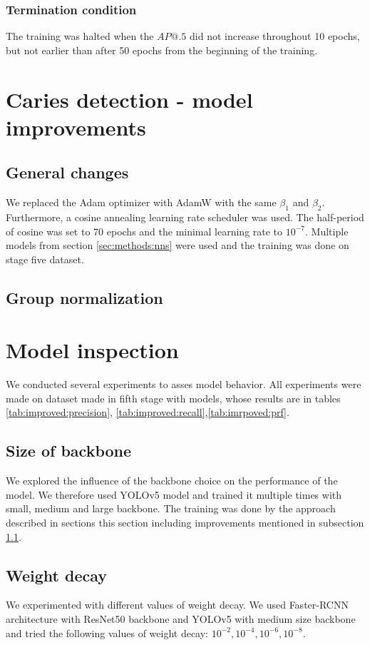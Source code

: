 \subsubsection{Termination condition}
The training was halted when the $AP@.5$ did not increase throughout 10 epochs, but not earlier than after 50 epochs from the beginning of the training.

\section{Caries detection - model improvements}
\subsection{General changes}
\label{sec:general_changes}
We replaced the Adam optimizer with AdamW with the same $\beta_1$ and $\beta_2$. Furthermore, a cosine annealing learning rate scheduler was used. The half-period of cosine was set to 70 epochs and the minimal learning rate to $10^{-7}$.
Multiple models from section \ref{sec:methods:nns} were used and the training was done on stage five dataset.
\subsection{Group normalization}


\section{Model inspection}
\label{sec:model_inspection}
We conducted several experiments to asses model behavior. All experiments were made on dataset made in fifth stage with models, whose results are in tables \ref{tab:improved:precision}, \ref{tab:improved:recall},\ref{tab:imrpoved:prf}.
\subsection{Size of backbone}
We explored the influence of the backbone choice on the performance of the model. We therefore used YOLOv5 model and trained it multiple times with small, medium and large backbone. The training was done by the approach described in sections this section including improvements mentioned in subsection \ref{sec:general_changes}.

\subsection{Weight decay}
We experimented with different values of weight decay. We used Faster-RCNN architecture with ResNet50 backbone and YOLOv5 with medium size backbone and tried the following values of weight decay: $10^{-2}, 10^{-4}, 10^{-6}, 10^{-8}$.

